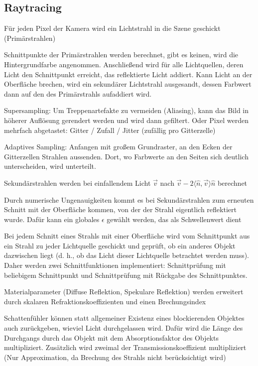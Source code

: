 \documentclass[12pt,landscape]{article}
\begin{document}
\begin{multicols}{3}
\section{Raytracing}
\begin{compactitem}
\item Für jeden Pixel der Kamera wird ein Lichtstrahl in die Szene geschickt (Primärstrahlen)
\item Schnittpunkte der Primärstrahlen werden berechnet, gibt es keinen, wird die Hintergrundfarbe angenommen. Anschließend wird für alle Lichtquellen, deren Licht den Schnittpunkt erreicht, das reflektierte Licht addiert. Kann Licht an der Oberfläche brechen, wird ein sekundärer Lichtstrahl ausgesandt, dessen Farbwert dann auf den des Primärstrahls aufaddiert wird. 
\item Supersampling: Um Treppenartefakte zu vermeiden (Aliasing), kann das Bild in höherer Auflösung gerendert werden und wird dann gefiltert. Oder Pixel werden mehrfach abgetastet: Gitter / Zufall / Jitter (zufällig pro Gitterzelle)
\item Adaptives Sampling: Anfangen mit großem Grundraster, an den Ecken der Gitterzellen Strahlen aussenden. Dort, wo Farbwerte an den Seiten sich deutlich unterscheiden, wird unterteilt.
\item Sekundärstrahlen werden bei einfallendem Licht $\vec{v}$ nach $\vec{v} - 2\langle \hat{n}, \vec{v} \rangle \hat{n}$ berechnet
\item Durch numerische Ungenauigkeiten kommt es bei Sekundärstrahlen zum erneuten Schnitt mit der Oberfläche kommen, von der der Strahl eigentlich reflektiert wurde. Dafür kann ein globales $\epsilon$ gewählt werden, das als Schwellenwert dient
\item Bei jedem Schnitt eines Strahls mit einer Oberfläche wird vom Schnittpunkt aus ein Strahl zu jeder Lichtquelle geschickt und geprüft, ob ein anderes Objekt dazwischen liegt (d. h., ob das Licht dieser Lichtquelle betrachtet werden muss).\\
Daher werden zwei Schnittfunktionen implementiert: Schnittprüfung mit beliebigem Schnittpunkt und Schnittprüfung mit Rückgabe des Schnittpunktes.
\item Materialparameter (Diffuse Reflektion, Spekulare Reflektion) werden erweitert durch skalaren Refraktionskoeffizienten und einen Brechungsindex
\item Schattenfühler können statt allgemeiner Existenz eines blockierenden Objektes auch zurückgeben, wieviel Licht durchgelassen wird. Dafür wird die Länge des Durchgangs durch das Objekt mit dem Absorptionsfaktor des Objekts multipliziert. Zusätzlich wird zweimal der Transmissionskoeffizient multipliziert (Nur Approximation, da Brechung des Strahls nicht berücksichtigt wird)

\end{compactitem}
\end{multicols}
\end{document}
